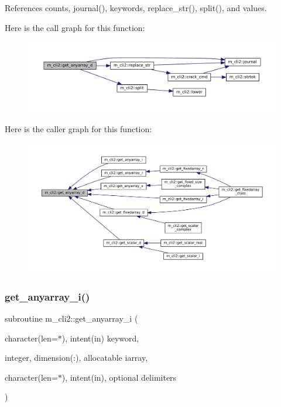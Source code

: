 References counts, journal(), keywords, replace\+\_\+str(), split(), and values.

Here is the call graph for this function\+:\nopagebreak
\begin{figure}[H]
\begin{center}
\leavevmode
\includegraphics[width=350pt]{namespacem__cli2_aaede1f28172778cf45f4b6c04967bbbd_cgraph}
\end{center}
\end{figure}
Here is the caller graph for this function\+:\nopagebreak
\begin{figure}[H]
\begin{center}
\leavevmode
\includegraphics[width=350pt]{namespacem__cli2_aaede1f28172778cf45f4b6c04967bbbd_icgraph}
\end{center}
\end{figure}
\mbox{\label{namespacem__cli2_ad314315dd5c93abff5168265f5ff0e4e}} 
\subsubsection{\texorpdfstring{get\+\_\+anyarray\+\_\+i()}{get\_anyarray\_i()}}
{\footnotesize\ttfamily subroutine m\+\_\+cli2\+::get\+\_\+anyarray\+\_\+i (\begin{DoxyParamCaption}\item[{character(len=$\ast$), intent(in)}]{keyword,  }\item[{integer, dimension(\+:), allocatable}]{iarray,  }\item[{character(len=$\ast$), intent(in), optional}]{delimiters }\end{DoxyParamCaption})\hspace{0.3cm}{\ttfamily [private]}}



